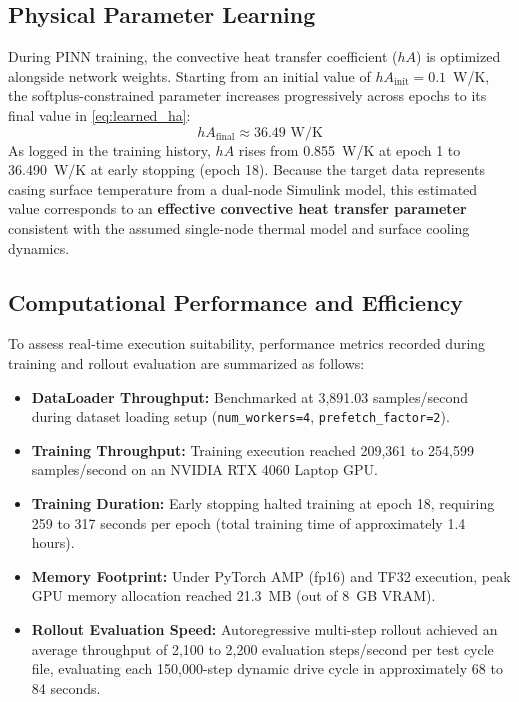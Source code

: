 \subsection{Physical Parameter Learning}
During PINN training, the convective heat transfer coefficient ($hA$) is optimized alongside network weights. Starting from an initial value of $hA_{\text{init}} = 0.1$~W/K, the softplus-constrained parameter increases progressively across epochs to its final value in \eqref{eq:learned_ha}:
\begin{equation}
hA_{\text{final}} \approx 36.49 \text{ W/K}
\label{eq:learned_ha}
\end{equation}
As logged in the training history, $hA$ rises from 0.855~W/K at epoch 1 to 36.490~W/K at early stopping (epoch 18). Because the target data represents casing surface temperature from a dual-node Simulink model, this estimated value corresponds to an \textbf{effective convective heat transfer parameter} consistent with the assumed single-node thermal model and surface cooling dynamics.

\subsection{Computational Performance and Efficiency}
To assess real-time execution suitability, performance metrics recorded during training and rollout evaluation are summarized as follows:
\begin{itemize}
    \item \textbf{DataLoader Throughput:} Benchmarked at 3,891.03 samples/second during dataset loading setup (\texttt{num\_workers=4}, \texttt{prefetch\_factor=2}).
    \item \textbf{Training Throughput:} Training execution reached 209,361 to 254,599 samples/second on an NVIDIA RTX 4060 Laptop GPU.
    \item \textbf{Training Duration:} Early stopping halted training at epoch 18, requiring 259 to 317 seconds per epoch (total training time of approximately 1.4 hours).
    \item \textbf{Memory Footprint:} Under PyTorch AMP (fp16) and TF32 execution, peak GPU memory allocation reached 21.3~MB (out of 8~GB VRAM).
    \item \textbf{Rollout Evaluation Speed:} Autoregressive multi-step rollout achieved an average throughput of 2,100 to 2,200 evaluation steps/second per test cycle file, evaluating each 150,000-step dynamic drive cycle in approximately 68 to 84 seconds.
\end{itemize}

